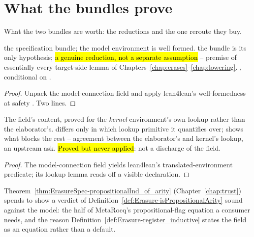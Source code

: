 \section{What the bundles prove}
\label{sec:eraser:derived}
What the two bundles are worth: the reductions and the one reroute they buy.

\begin{theorem}
\label{thm:ErasureSpec-envWF}
\leanok
{} the specification bundle;
 the model environment is well formed.
 the bundle is its only hypothesis; \hl{a genuine reduction, not a separate assumption}
-- premise of essentially every target-side lemma of
Chapters~\ref{chap:erases}--\ref{chap:lowering}.
 \stProved{}, conditional on \stAssumed{} .
\end{theorem}
\begin{proof}
\leanok
{}
 Unpack the model-connection field and apply lean4lean's well-formedness at safety
. Two lines.
\end{proof}

\begin{proposition}
\label{prop:ErasureSpec-decl_adequate_of_kernelFind}
\leanok
{} The  field's content, proved for the \emph{kernel}
environment's own lookup rather than the elaborator's.
 differs only in which lookup primitive it quantifies over; shows what blocks the rest
-- agreement between the elaborator's and kernel's lookup, an upstream ask. \hl{Proved but never
applied}: not a discharge of the field.
\end{proposition}
\begin{proof}
\leanok
{}
 The model-connection field yields lean4lean's translated-environment predicate; its
lookup lemma reads off a visible declaration.
\end{proof}

\begin{remark}
 Theorem~\ref{thm:ErasureSpec-propositionalInd_of_arity} (Chapter~\ref{chap:trust})
spends  to show a  verdict of
Definition~\ref{def:Erasure-isPropositionalArity} sound against the model: the half of MetaRocq's
propositional-flag equation a consumer needs, and the reason
Definition~\ref{def:Erasure-register_inductive} states the field as an equation rather than a
default.
\end{remark}

